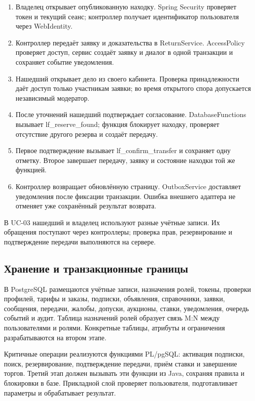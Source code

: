 \begin{enumerate}
\item Владелец открывает опубликованную находку. Spring Security проверяет токен и текущий сеанс; контроллер получает идентификатор пользователя через Web\allowbreak{}Identity.
\item Контроллер передаёт заявку и доказательства в Return\allowbreak{}Service. Access\allowbreak{}Policy проверяет доступ, сервис создаёт заявку и диалог в одной транзакции и сохраняет событие уведомления.
\item Нашедший открывает дело из своего кабинета. Проверка принадлежности даёт доступ только участникам заявки; во время открытого спора допускается независимый модератор.
\item После уточнений нашедший подтверждает согласование. Database\allowbreak{}Functions вызывает lf\_\allowbreak{}reserve\_\allowbreak{}found; функция блокирует находку, проверяет отсутствие другого резерва и создаёт передачу.
\item Первое подтверждение вызывает lf\_\allowbreak{}confirm\_\allowbreak{}transfer и сохраняет одну отметку. Второе завершает передачу, заявку и состояние находки той же функцией.
\item Контроллер возвращает обновлённую страницу. Outbox\allowbreak{}Service доставляет уведомления после фиксации транзакции. Ошибка внешнего адаптера не отменяет уже сохранённый результат возврата.
\end{enumerate}

В UC-03 нашедший и владелец используют разные учётные записи. Их обращения поступают через контроллеры; проверка прав, резервирование и подтверждение передачи выполняются на сервере.

\FloatBarrier
{}
\subsection{Хранение и транзакционные границы}

В Postgre\allowbreak{}SQL размещаются учётные записи, назначения ролей, токены, проверки профилей, тарифы и заказы, подписки, объявления, справочники, заявки, сообщения, передачи, жалобы, допуски, аукционы, ставки, уведомления, очередь событий и аудит. Таблица назначений ролей образует связь M:N между пользователями и ролями. Конкретные таблицы, атрибуты и ограничения разрабатываются на втором этапе.

Критичные операции реализуются функциями PL/\allowbreak{}pg\allowbreak{}SQL: активация подписки, поиск, резервирование, подтверждение передачи, приём ставки и завершение торгов. Третий этап должен вызывать эти функции из Java, сохраняя правила и блокировки в базе. Прикладной слой проверяет пользователя, подготавливает параметры и обрабатывает результат.

